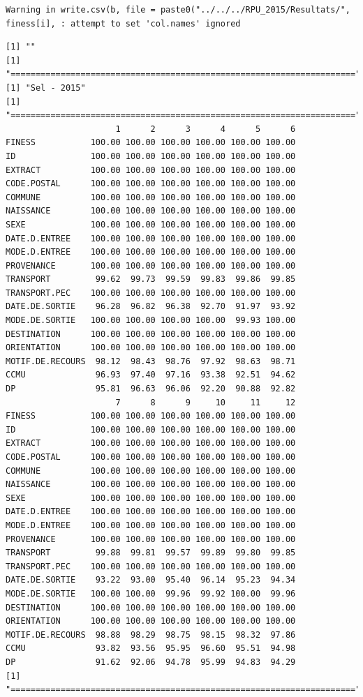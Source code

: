 \documentclass[]{article}
\begin{document}
\begin{verbatim}
Warning in write.csv(b, file = paste0("../../../RPU_2015/Resultats/",
finess[i], : attempt to set 'col.names' ignored
\end{verbatim}

\begin{verbatim}
[1] ""
[1] "====================================================================="
[1] "Sel - 2015"
[1] "====================================================================="
                      1      2      3      4      5      6
FINESS           100.00 100.00 100.00 100.00 100.00 100.00
ID               100.00 100.00 100.00 100.00 100.00 100.00
EXTRACT          100.00 100.00 100.00 100.00 100.00 100.00
CODE.POSTAL      100.00 100.00 100.00 100.00 100.00 100.00
COMMUNE          100.00 100.00 100.00 100.00 100.00 100.00
NAISSANCE        100.00 100.00 100.00 100.00 100.00 100.00
SEXE             100.00 100.00 100.00 100.00 100.00 100.00
DATE.D.ENTREE    100.00 100.00 100.00 100.00 100.00 100.00
MODE.D.ENTREE    100.00 100.00 100.00 100.00 100.00 100.00
PROVENANCE       100.00 100.00 100.00 100.00 100.00 100.00
TRANSPORT         99.62  99.73  99.59  99.83  99.86  99.85
TRANSPORT.PEC    100.00 100.00 100.00 100.00 100.00 100.00
DATE.DE.SORTIE    96.28  96.82  96.38  92.70  91.97  93.92
MODE.DE.SORTIE   100.00 100.00 100.00 100.00  99.93 100.00
DESTINATION      100.00 100.00 100.00 100.00 100.00 100.00
ORIENTATION      100.00 100.00 100.00 100.00 100.00 100.00
MOTIF.DE.RECOURS  98.12  98.43  98.76  97.92  98.63  98.71
CCMU              96.93  97.40  97.16  93.38  92.51  94.62
DP                95.81  96.63  96.06  92.20  90.88  92.82
                      7      8      9     10     11     12
FINESS           100.00 100.00 100.00 100.00 100.00 100.00
ID               100.00 100.00 100.00 100.00 100.00 100.00
EXTRACT          100.00 100.00 100.00 100.00 100.00 100.00
CODE.POSTAL      100.00 100.00 100.00 100.00 100.00 100.00
COMMUNE          100.00 100.00 100.00 100.00 100.00 100.00
NAISSANCE        100.00 100.00 100.00 100.00 100.00 100.00
SEXE             100.00 100.00 100.00 100.00 100.00 100.00
DATE.D.ENTREE    100.00 100.00 100.00 100.00 100.00 100.00
MODE.D.ENTREE    100.00 100.00 100.00 100.00 100.00 100.00
PROVENANCE       100.00 100.00 100.00 100.00 100.00 100.00
TRANSPORT         99.88  99.81  99.57  99.89  99.80  99.85
TRANSPORT.PEC    100.00 100.00 100.00 100.00 100.00 100.00
DATE.DE.SORTIE    93.22  93.00  95.40  96.14  95.23  94.34
MODE.DE.SORTIE   100.00 100.00  99.96  99.92 100.00  99.96
DESTINATION      100.00 100.00 100.00 100.00 100.00 100.00
ORIENTATION      100.00 100.00 100.00 100.00 100.00 100.00
MOTIF.DE.RECOURS  98.88  98.29  98.75  98.15  98.32  97.86
CCMU              93.82  93.56  95.95  96.60  95.51  94.98
DP                91.62  92.06  94.78  95.99  94.83  94.29
[1] "====================================================================="
\end{verbatim}
\end{document}
